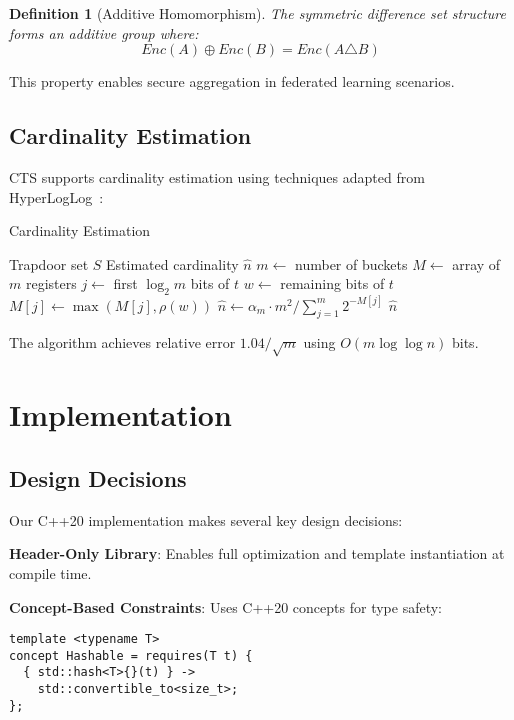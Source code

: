\documentclass[10pt,conference]{IEEEtran}
\newtheorem{definition}[theorem]{Definition}
\begin{document}
\begin{definition}[Additive Homomorphism]
The symmetric difference set structure forms an additive group where:
$$Enc(A) \oplus Enc(B) = Enc(A \triangle B)$$
\end{definition}

This property enables secure aggregation in federated learning scenarios.

\subsection{Cardinality Estimation}

CTS supports cardinality estimation using techniques adapted from HyperLogLog~\cite{flajolet2007hyperloglog}:

\begin{algorithm}
\caption{Cardinality Estimation}
\label{alg:cardinality}
\begin{algorithmic}[1]
\REQUIRE Trapdoor set $S$
\ENSURE Estimated cardinality $\hat{n}$
\STATE $m \leftarrow$ number of buckets
\STATE $M \leftarrow$ array of $m$ registers
  \STATE $j \leftarrow$ first $\log_2 m$ bits of $t$
  \STATE $w \leftarrow$ remaining bits of $t$
  \STATE $M[j] \leftarrow \max(M[j], \rho(w))$
\ENDFOR
\STATE $\hat{n} \leftarrow \alpha_m \cdot m^2 / \sum_{j=1}^{m} 2^{-M[j]}$
\RETURN $\hat{n}$
\end{algorithmic}
\end{algorithm}

The algorithm achieves relative error $1.04/\sqrt{m}$ using $O(m \log \log n)$ bits.

\section{Implementation}
\label{sec:implementation}

\subsection{Design Decisions}

Our C++20 implementation makes several key design decisions:

\textbf{Header-Only Library}: Enables full optimization and template instantiation at compile time.

\textbf{Concept-Based Constraints}: Uses C++20 concepts for type safety:
\begin{lstlisting}
template <typename T>
concept Hashable = requires(T t) {
  { std::hash<T>{}(t) } ->
    std::convertible_to<size_t>;
};
\end{lstlisting}
\end{document}
